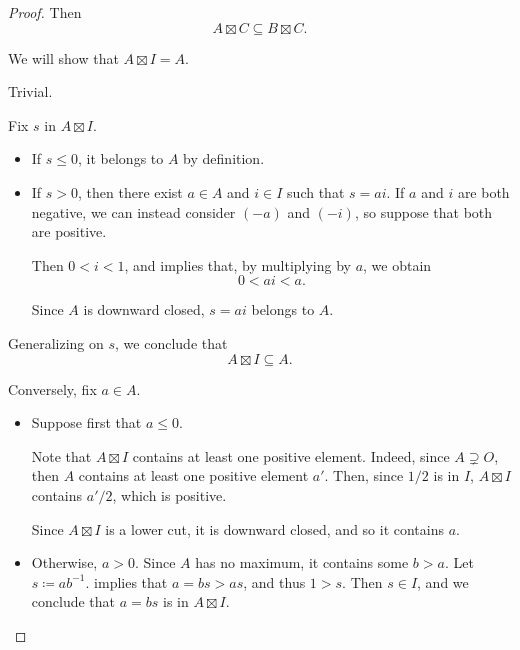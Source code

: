 \begin{proof}
  Then
  \begin{equation*}
    A \boxtimes C \subseteq B \boxtimes C.
  \end{equation*}

   We will show that \( A \boxtimes I = A \).

   Trivial.

   Fix \( s \) in \( A \boxtimes I \).
  \begin{itemize}
    \item If \( s \leq 0 \), it belongs to \( A \) by definition.
    \item If \( s > 0 \), then there exist \( a \in A \) and \( i \in I \) such that \( s = ai \). If \( a \) and \( i \) are both negative, we can instead consider \( (-a) \) and \( (-i) \), so suppose that both are positive.

    Then \( 0 < i < 1 \), and  implies that, by multiplying by \( a \), we obtain
    \begin{equation*}
      0 < ai < a.
    \end{equation*}

    Since \( A \) is downward closed, \( s = ai \) belongs to \( A \).
  \end{itemize}

  Generalizing on \( s \), we conclude that
  \begin{equation*}
    A \boxtimes I \subseteq A.
  \end{equation*}

  Conversely, fix \( a \in A \).
  \begin{itemize}
    \item Suppose first that \( a \leq 0 \).

    Note that \( A \boxtimes I \) contains at least one positive element. Indeed, since \( A \supsetneq O \), then \( A \) contains at least one positive element \( a' \). Then, since \( 1 / 2 \) is in \( I \), \( A \boxtimes I \) contains \( a' / 2 \), which is positive.

    Since \( A \boxtimes I \) is a lower cut, it is downward closed, and so it contains \( a \).

    \item Otherwise, \( a > 0 \). Since \( A \) has no maximum, it contains some \( b > a \). Let \( s \coloneqq a b^{-1} \).  implies that \( a = b s > a s \), and thus \( 1 > s \). Then \( s \in I \), and we conclude that \( a = b s \) is in \( A \boxtimes I \).
  \end{itemize}


\end{proof}

